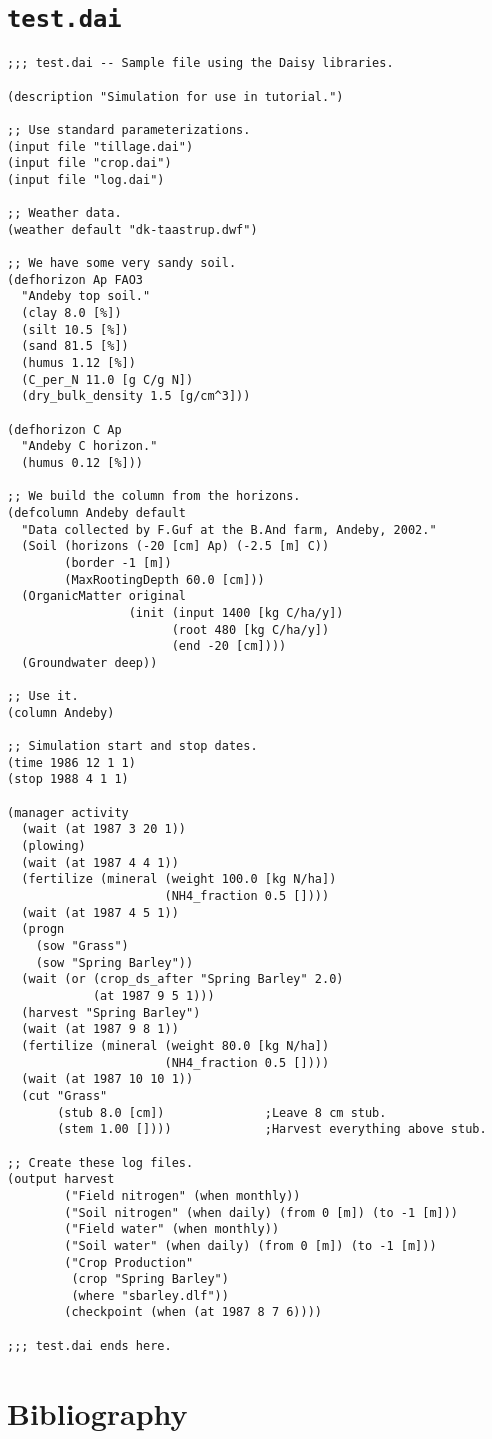 \documentclass[a4paper]{article}
\begin{document}
\section{\texttt{test.dai}}
\label{app:test}

\begin{verbatim}
;;; test.dai -- Sample file using the Daisy libraries.

(description "Simulation for use in tutorial.")

;; Use standard parameterizations.
(input file "tillage.dai")
(input file "crop.dai")
(input file "log.dai")

;; Weather data.
(weather default "dk-taastrup.dwf")

;; We have some very sandy soil.
(defhorizon Ap FAO3
  "Andeby top soil."
  (clay 8.0 [%])
  (silt 10.5 [%])
  (sand 81.5 [%])
  (humus 1.12 [%])
  (C_per_N 11.0 [g C/g N])
  (dry_bulk_density 1.5 [g/cm^3]))

(defhorizon C Ap
  "Andeby C horizon."
  (humus 0.12 [%]))

;; We build the column from the horizons.
(defcolumn Andeby default
  "Data collected by F.Guf at the B.And farm, Andeby, 2002."
  (Soil (horizons (-20 [cm] Ap) (-2.5 [m] C))
        (border -1 [m])
        (MaxRootingDepth 60.0 [cm]))
  (OrganicMatter original
                 (init (input 1400 [kg C/ha/y])
                       (root 480 [kg C/ha/y])
                       (end -20 [cm])))
  (Groundwater deep))

;; Use it.
(column Andeby)

;; Simulation start and stop dates.
(time 1986 12 1 1)
(stop 1988 4 1 1)

(manager activity
  (wait (at 1987 3 20 1))
  (plowing)
  (wait (at 1987 4 4 1))
  (fertilize (mineral (weight 100.0 [kg N/ha])
                      (NH4_fraction 0.5 [])))
  (wait (at 1987 4 5 1))
  (progn
    (sow "Grass")
    (sow "Spring Barley"))
  (wait (or (crop_ds_after "Spring Barley" 2.0)
            (at 1987 9 5 1)))
  (harvest "Spring Barley")
  (wait (at 1987 9 8 1))
  (fertilize (mineral (weight 80.0 [kg N/ha])
                      (NH4_fraction 0.5 [])))
  (wait (at 1987 10 10 1))
  (cut "Grass"
       (stub 8.0 [cm])              ;Leave 8 cm stub.
       (stem 1.00 [])))             ;Harvest everything above stub.

;; Create these log files.
(output harvest
        ("Field nitrogen" (when monthly))
        ("Soil nitrogen" (when daily) (from 0 [m]) (to -1 [m]))
        ("Field water" (when monthly))
        ("Soil water" (when daily) (from 0 [m]) (to -1 [m]))
        ("Crop Production"
         (crop "Spring Barley")
         (where "sbarley.dlf"))
        (checkpoint (when (at 1987 8 7 6))))

;;; test.dai ends here.
\end{verbatim}

\section{Bibliography}

\end{document}
